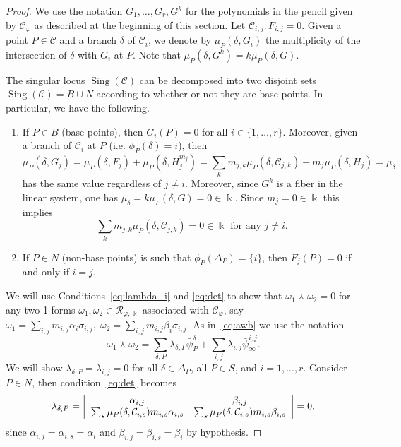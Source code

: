 \documentclass[11pt]{amsart}
\DeclareMathOperator{\Sing}{Sing}
\def\cC{\mathcal{C}}
\def\cR{{\mathcal R}}
\def\kk{\Bbbk}
\def\w{\omega}
\theoremstyle{plain}
\theoremstyle{definition}
\begin{document}
\begin{proof}
We use the notation $G_1, \ldots ,G_r,G^k$ for the polynomials in the pencil given by $\cC_\varphi$ as described at the beginning of this section. Let $\cC_{i,j}: F_{i,j}=0$. 
Given a point $P\in \cC$ and a branch $\delta$ of $\cC_i$, we denote by $\mu_P(\delta,G_i)$ the multiplicity of the intersection of $\delta$ with $G_i$ at $P$. Note that 
$\mu_P(\delta,G^k)=k\mu_P(\delta,G)$.

The singular locus $\Sing(\cC)$ can be decomposed into two disjoint sets $\Sing(\cC)=B\cup N$ according to whether or not they are base points. In particular, we have the following.
\begin{enumerate}
\item \label{item:base}
If $P\in B$ (base points), then $G_i(P)=0$ for all $i \in \{1, \ldots ,r\}$. Moreover, given a branch of $\cC_i$ at $P$ (i.e. $\phi_P(\delta)=i$), then 
\begin{equation} \label{eq:mu_delta}
\mu_P(\delta,G_j)=
\mu_P(\delta,F_j)+\mu_P(\delta,H_j^{m_j})=
\sum_k m_{j,k}\mu_P(\delta,\cC_{j,k})+m_j\mu_P(\delta,H_j)=\mu_\delta
\end{equation}
has the same value regardless of $j\neq i$. Moreover, since $G^k$ is a fiber in the linear system, one has $\mu_\delta=k\mu_P(\delta,G)=0\in\kk$. Since $m_j=0\in\kk$ this implies 
\begin{equation}\label{eq:quasift}
\sum_k m_{j,k}\mu_P(\delta,\cC_{j,k})=0\in\kk \textrm{ for any } j\neq i.
\end{equation}
\item \label{item:nonbase}
If $P\in N$ (non-base points) is such that $\phi_P(\Delta_P)=\{i\}$, then $F_j(P)=0$ if and only if $i=j$.
\end{enumerate}
We will use Conditions~\eqref{eq:lambda_i} and \eqref{eq:det} 
to show that $\w_1\curlywedge \w_2=0$ for any two 1-forms $\w_1,\w_2\in \cR_{\varphi,\kk}$ associated with $\cC_\varphi$, say $\w_1 = \sum_{i,j} m_{i,j}\alpha_{i}\sigma_{i,j}, \; \w_2 = \sum_{i,j} m_{i,j}\beta_{i}\sigma_{i,j}$. 
As in~\eqref{eq:awb} we use the notation 
$$
\w_1\curlywedge\w_2=
\sum_{\delta,P}\lambda_{\delta,P} \bar\psi_{P}^\delta+
\sum_{i,j} \lambda_{i,j}\bar\psi_\infty^{i,j}.
$$
We will show $\lambda_{\delta,P}=\lambda_{i,j}=0$ for all $\delta\in\Delta_P$, all $P\in S$, and $i=1,...,r$.
Consider $P\in N$, then 
condition~\eqref{eq:det} becomes
\begin{equation} \label{eq:non_base_P}
\lambda_{\delta,P}=    
\left|
\array{cc}
\alpha_{i,j} & \beta_{i,j}\\
\sum_s \mu_P(\delta,\cC_{i,s})m_{i,s}\alpha_{i,s} & \sum_s \mu_P(\delta,\cC_{i,s})m_{i,s}\beta_{i,s}\\
\endarray
\right|=0.
\end{equation}
since $\alpha_{i,j}=\alpha_{i,s}=\alpha_i$
and 
$\beta_{i,j}=\beta_{i,s}=\beta_i$ by hypothesis.


\end{proof}
\end{document}
